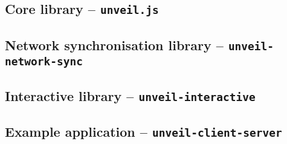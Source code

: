 \subsection{Core library -- \texttt{unveil.js}}
\label{sec:implementation-architecture-core}

\subsection{Network synchronisation library -- \texttt{unveil-network-sync}}
\label{sec:implementation-architecture-network-sync}

\subsection{Interactive library -- \texttt{unveil-interactive}}
\label{sec:implementation-architecture-interactive}

\subsection{Example application -- \texttt{unveil-client-server}}
\label{sec:implementation-architecture-client-server}
